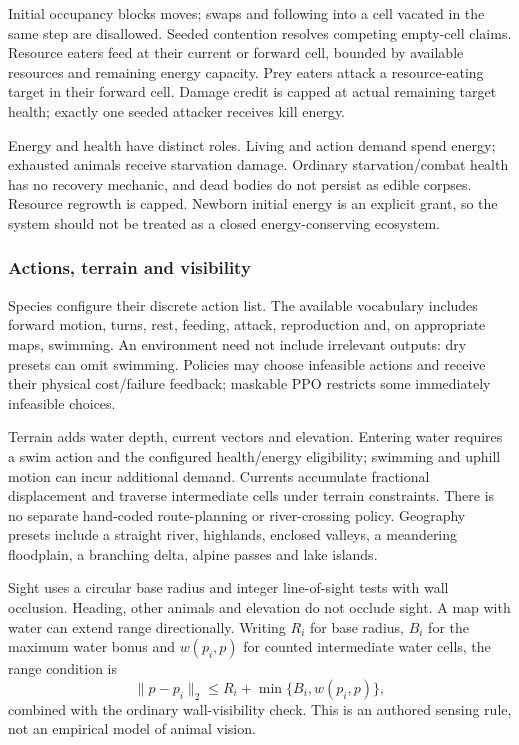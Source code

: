 Initial occupancy blocks moves; swaps and following into a cell vacated in the
same step are disallowed. Seeded contention resolves competing empty-cell
claims. Resource eaters feed at their current or forward cell, bounded by
available resources and remaining energy capacity. Prey eaters attack a
resource-eating target in their forward cell. Damage credit is capped at actual
remaining target health; exactly one seeded attacker receives kill energy.

Energy and health have distinct roles. Living and action demand spend energy;
exhausted animals receive starvation damage. Ordinary starvation/combat health
has no recovery mechanic, and dead bodies do not persist as edible corpses.
Resource regrowth is capped. Newborn initial energy is an explicit grant, so the
system should not be treated as a closed energy-conserving ecosystem.

\subsubsection{Actions, terrain and visibility}
Species configure their discrete action list. The available vocabulary includes
forward motion, turns, rest, feeding, attack, reproduction and, on appropriate
maps, swimming. An environment need not include irrelevant outputs: dry presets
can omit swimming. Policies may choose infeasible actions and receive their
physical cost/failure feedback; maskable PPO restricts some immediately
infeasible choices.

Terrain adds water depth, current vectors and elevation. Entering water requires
a swim action and the configured health/energy eligibility; swimming and uphill
motion can incur additional demand. Currents accumulate fractional displacement
and traverse intermediate cells under terrain constraints. There is no
separate hand-coded route-planning or river-crossing policy. Geography presets
include a straight river, highlands, enclosed valleys, a meandering floodplain,
a branching delta, alpine passes and lake islands.

Sight uses a circular base radius and integer line-of-sight tests with wall
occlusion. Heading, other animals and elevation do not occlude sight. A map with
water can extend range directionally. Writing $R_i$ for base radius, $B_i$ for
the maximum water bonus and $w(p_i,p)$ for counted intermediate water cells,
the range condition is
\begin{equation}
 \lVert p-p_i\rVert_2\leq R_i+\min\{B_i,w(p_i,p)\},
\end{equation}
combined with the ordinary wall-visibility check. This is an authored sensing
rule, not an empirical model of animal vision.

